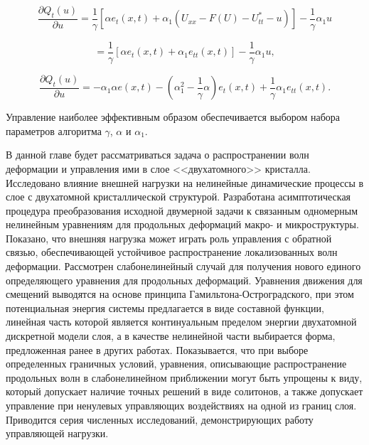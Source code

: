 $$
	\frac{\partial Q_t(u)}{\partial u} = \frac{1}{\gamma} \left[\alpha e_t(x,t) + \alpha_1 (U_{xx}-F\left(U\right)-U^*_{tt} - u)\right] - \frac{1}{\gamma} \alpha_1 u
$$

$$
	 = \frac{1}{\gamma} \left[\alpha e_t(x,t) + \alpha_1 e_{tt}(x,t)\right] - \frac{1}{\gamma} \alpha_1 u,
$$


\begin{equation}
	\frac{\partial Q_t(u)}{\partial u} =  - \alpha_1 \alpha e(x,t) - \left(\alpha_1^2 - \frac{1}{\gamma}\alpha\right) e_t(x,t) + \frac{1}{\gamma}\alpha_1 e_{tt}(x,t).
\end{equation}



Управление наиболее эффективным образом обеспечивается выбором набора параметров алгоритма $\gamma$, $\alpha$ и $\alpha_1$.

В данной главе будет рассматриваться задача о распространении волн деформации и управления ими в слое <<двухатомного>> кристалла. Исследовано влияние внешней нагрузки на нелинейные динамические процессы в слое с двухатомной кристаллической структурой. Разработана асимптотическая процедура преобразования исходной двумерной задачи к связанным одномерным нелинейным уравнениям для продольных деформаций макро- и микроструктуры. Показано, что внешняя нагрузка может играть роль управления с обратной связью, обеспечивающей устойчивое распространение локализованных волн деформации. Рассмотрен слабонелинейный случай для получения нового единого определяющего уравнения для продольных деформаций. Уравнения движения для смещений выводятся на основе принципа Гамильтона-Остроградского, при этом потенциальная энергия системы предлагается в виде составной функции, линейная часть которой является континуальным пределом энергии двухатомной дискретной модели слоя, а в качестве нелинейной части выбирается форма, предложенная ранее в других работах. Показывается, что при выборе определенных граничных условий, уравнения, описывающие распространение продольных волн в слабонелинейном приближении могут быть упрощены к виду, который допускает наличие точных решений в виде солитонов, а также допускает управление при ненулевых управляющих воздействиях на одной из границ слоя. Приводится серия численных исследований, демонстрирующих работу управляющей нагрузки.

